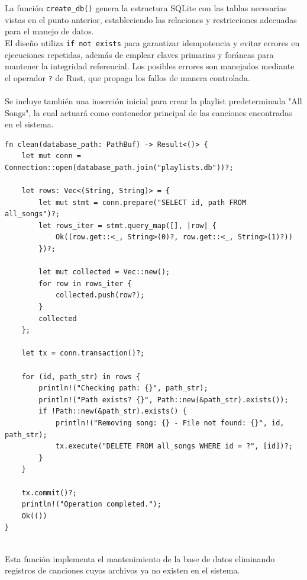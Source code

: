 \documentclass[11pt, a4paper]{article}
\begin{document}
            La función \texttt{create\_db()} genera la estructura SQLite con las tablas necesarias vistas en el punto anterior, estableciendo las relaciones y restricciones adecuadas para el manejo de datos. \\

            El diseño utiliza \texttt{if not exists} para garantizar idempotencia y evitar errores en ejecuciones repetidas, además de emplear claves primarias y foráneas para mantener la integridad referencial. Los posibles errores son manejados mediante el operador \texttt{?} de Rust, que propaga los fallos de manera controlada. \\ \\

            Se incluye también una inserción inicial para crear la playlist predeterminada "All Songs", la cual actuará como contenedor principal de las canciones encontradas en el sistema.

            \begin{lstlisting}[caption={fn clean()}]
fn clean(database_path: PathBuf) -> Result<()> {
    let mut conn = Connection::open(database_path.join("playlists.db"))?;

    let rows: Vec<(String, String)> = {
        let mut stmt = conn.prepare("SELECT id, path FROM all_songs")?;
        let rows_iter = stmt.query_map([], |row| {
            Ok((row.get::<_, String>(0)?, row.get::<_, String>(1)?))
        })?;

        let mut collected = Vec::new();
        for row in rows_iter {
            collected.push(row?);
        }
        collected
    };

    let tx = conn.transaction()?;

    for (id, path_str) in rows {
        println!("Checking path: {}", path_str);
        println!("Path exists? {}", Path::new(&path_str).exists()); 
        if !Path::new(&path_str).exists() {
            println!("Removing song: {} - File not found: {}", id, path_str);
            tx.execute("DELETE FROM all_songs WHERE id = ?", [id])?;
        }
    }

    tx.commit()?;
    println!("Operation completed.");
    Ok(())
}
            \end{lstlisting}
            ‎ \\

            Esta función implementa el mantenimiento de la base de datos eliminando registros de canciones cuyos archivos ya no existen en el sistema. \\
\end{document}
